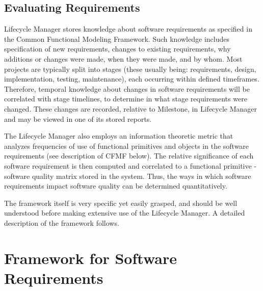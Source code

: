 \documentclass[letterpaper,10pt]{article}
\begin{document}
		\subsection{Evaluating Requirements}

            Lifecycle Manager stores knowledge about software requirements 
            as specified in the Common Functional Modeling Framework. Such 
            knowledge includes specification of new requirements, changes 
            to existing requirements, why additions or changes were made, 
            when they were made, and by whom. Most projects are typically 
            split into stages (these usually being: requirements, design,
            implementation, testing, maintenance), each occurring within
            defined timeframes. Therefore, temporal knowledge about changes
            in software requirements will be correlated with stage
            timelines, to determine in what stage requirements were changed.
            These changes are recorded, relative to Milestone, in Lifecycle 
            Manager and may be viewed in one of its stored reports.

            The Lifecycle Manager also employs an information theoretic 
            metric that analyzes frequencies of use of functional primitives 
            and objects in the software requirements (see description of 
            CFMF below). The relative significance of each software 
            requirement is then computed and correlated to a functional 
            primitive - software quality matrix stored in the system. Thus,  
            the ways in which software requirements impact software quality 
            can be determined quantitatively.

            The framework itself is very specific yet easily grasped, and 
            should be well understood before making extensive use of the 
            Lifecycle Manager.  A detailed description of the framework 
            follows.
		
	\section{Framework for Software Requirements}
        \label{sec:cfmf}
\end{document}

